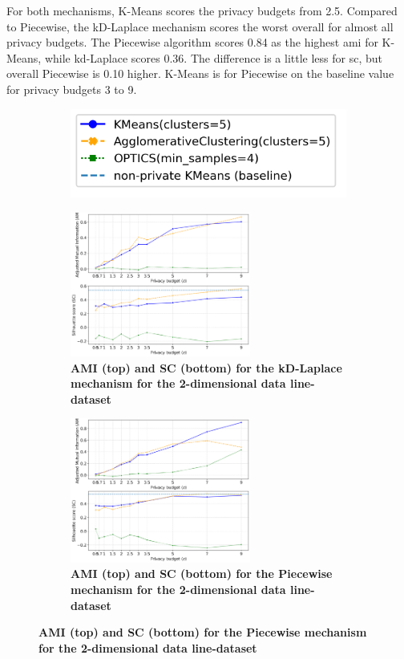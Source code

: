 For both mechanisms, K-Means scores the privacy budgets from 2.5.
Compared to Piecewise, the kD-Laplace mechanism scores the worst overall for almost all privacy budgets.
The Piecewise algorithm scores 0.84 as the highest \gls{ami} for K-Means, while kd-Laplace scores 0.36.
The difference is a little less for \gls{sc}, but overall Piecewise is 0.10 higher.
K-Means is for Piecewise on the baseline value for privacy budgets 3 to 9.
\newpage
\begin{figure}[H]
      \centering
      \begin{subfigure}{0.3\textwidth}
            \includegraphics[width=\textwidth]{Results/kd-laplace/kd-Laplace/circle-dataset/legend_2.png}
      \end{subfigure}
      \begin{subfigure}{1\textwidth}
            \centering
            \caption{\textbf{AMI (top) and SC (bottom) for the kD-Laplace mechanism for the 2-dimensional data line-dataset}}
            \includegraphics[width=0.65\textwidth]{Results/kd-laplace/kd-Laplace/line-dataset/ami-and-sc_2_dimensions.png}
            \centering
      \end{subfigure}
      \begin{subfigure}{1\textwidth}
            \centering
            \caption{\textbf{AMI (top) and SC (bottom) for the Piecewise mechanism for the 2-dimensional data line-dataset}}
            \includegraphics[width=0.65\textwidth]{Results/kd-laplace/piecewise/line-dataset/ami-and-sc_2_dimensions.png}

\end{subfigure}
\end{figure}

